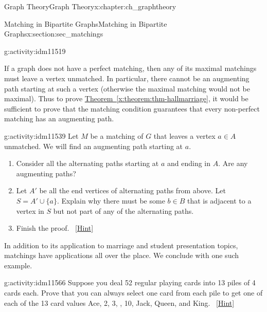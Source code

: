 \documentclass[oneside,10pt,]{book}
\numberwithin{equation}{chapter}
\newcommand{\vtx}[2]{node[fill,circle,inner sep=0pt, minimum size=4pt,label=#1:#2]{}}
\renewcommand{\v}{\vtx{above}{}}
\begin{document}
\begin{chapterptx}{Graph Theory}{}{Graph Theory}{}{}{x:chapter:ch_graphtheory}
\begin{sectionptx}{Matching in Bipartite Graphs}{}{Matching in Bipartite Graphs}{}{}{x:section:sec_matchings}
\begin{activity}{}{g:activity:idm11519}
\begin{enumerate}[font=\bfseries,label=(\alph*),ref=\alph*]
\begin{sidebyside}{1}{0.25}{0.25}{0}
\begin{sbspanel}{0.5}
{
}%
\end{sbspanel}%
\end{sidebyside}%
\end{enumerate}
\end{activity}
If a graph does not have a perfect matching, then any of its maximal matchings must leave a vertex unmatched.  In particular, there cannot be an augmenting path starting at such a vertex (otherwise the maximal matching would not be maximal).  Thus to prove \hyperref[x:theorem:thm-hallmarriage]{Theorem~\ref{x:theorem:thm-hallmarriage}}, it would be sufficient to prove that the matching condition guarantees that every non-perfect matching has an augmenting path.%
\begin{activity}{}{g:activity:idm11539}%
Let \(M\) be a matching of \(G\) that leaves a vertex \(a \in A\) unmatched.  We will find an augmenting path starting at \(a\).%
\begin{enumerate}[font=\bfseries,label=(\alph*),ref=\alph*]
\item{}Consider all the alternating paths starting at \(a\) and ending in \(A\).  Are any augmenting paths?%
\item{}Let \(A'\) be all the end vertices of alternating paths from above.  Let \(S = A' \cup \{a\}\).  Explain why there must be some \(b \in B\) that is adjacent to a vertex in \(S\) but not part of any of the alternating paths.%
\item{}Finish the proof.%
\qquad~\hfill{\tiny\hyperlink{g:hint:idm11561-back}{[Hint]}}\end{enumerate}
\end{activity}
In addition to its application to marriage and student presentation topics, matchings have applications all over the place. We conclude with one such example.%
\begin{activity}{}{g:activity:idm11566}%
Suppose you deal 52 regular playing cards into 13 piles of 4 cards each. Prove that you can always select one card from each pile to get one of each of the 13 card values Ace, 2, 3, \textellipsis{}, 10, Jack, Queen, and King.%
\qquad~\hfill{\tiny\hyperlink{g:hint:idm11570-back}{[Hint]}}\end{activity}

\end{sectionptx}
\end{chapterptx}
\end{document}
